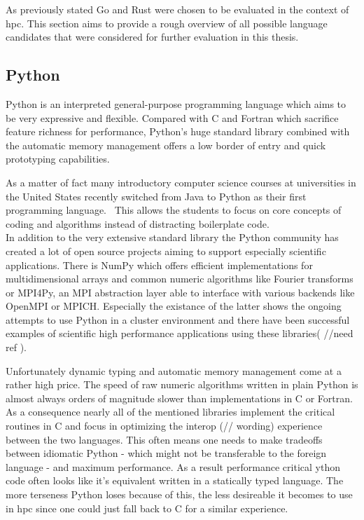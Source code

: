 As previously stated Go and Rust were chosen to be evaluated in the context of \gls{hpc}. This section aims to provide a rough overview of all possible language candidates that were considered for further evaluation in this thesis.

\subsection*{Python}
\label{subsec:State_of_the_art::Candidates::Python}

Python is an interpreted general-purpose programming language which aims to be very expressive and flexible. Compared with C and Fortran which sacrifice feature richness for performance, Python's huge standard library combined with the automatic memory management offers a low border of entry and quick prototyping capabilities.

As a matter of fact many introductory computer science courses at universities in the United States recently switched from Java to Python as their first programming language.~\cite{GUO14, intro_py} This allows the students to focus on core concepts of coding and algorithms instead of distracting boilerplate code.
\\


In addition to the very extensive standard library the Python community has created a lot of open source projects aiming to support especially scientific applications. There is NumPy which offers efficient implementations for multidimensional arrays and common numeric algorithms like Fourier transforms or MPI4Py, an \gls{MPI} abstraction layer able to interface with various backends like OpenMPI or MPICH. Especially the existance of the latter shows the ongoing attempts to use Python in a cluster environment and there have been successful examples of scientific high performance applications using these libraries( //need ref ).

Unfortunately dynamic typing and automatic memory management come at a rather high price. The speed of raw numeric algorithms written in plain Python is almost always orders of magnitude slower than implementations in C or Fortran. As a consequence nearly all of the mentioned libraries implement the critical routines in C and focus in optimizing the interop (// wording) experience between the two languages. This often means one needs to make tradeoffs between idiomatic Python - which might not be transferable to the foreign language - and maximum performance. As a result performance critical ython code often looks like it's equivalent written in a statically typed language. The more terseness Python loses because of this, the less desireable it becomes to use in \gls{hpc} since one could just fall back to C for a similar experience.

